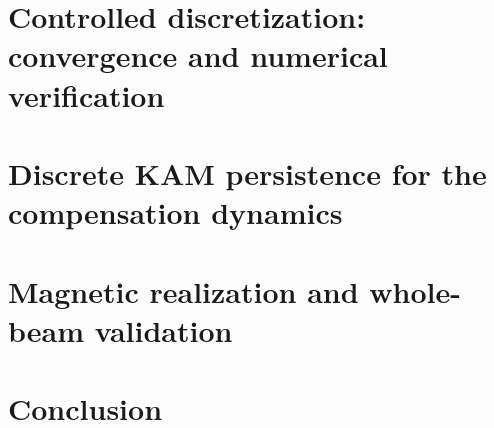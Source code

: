 \documentclass[doublespace,Afour,sageh,times]{sagej}
\begin{document}
\section{Controlled discretization: convergence and numerical verification}\label{sec:analysis}


\section{Discrete KAM persistence for the compensation dynamics}\label{sec:kam}

\section{Magnetic realization and whole-beam validation}\label{sec:application}

\section{Conclusion}\label{sec:conclusion}



\end{document}
